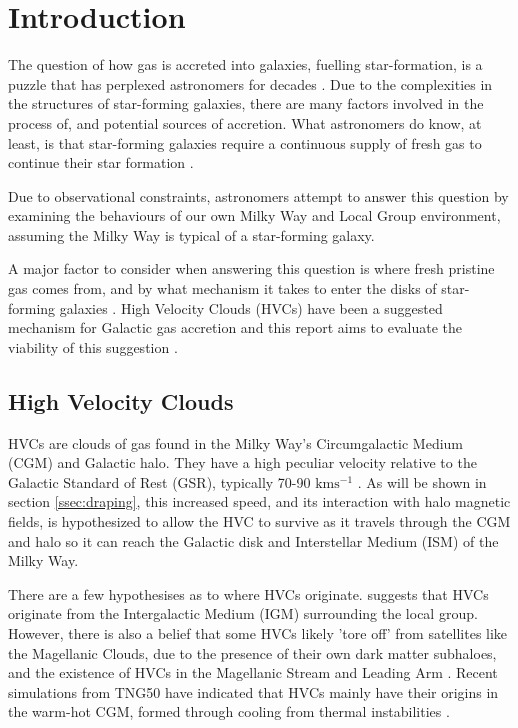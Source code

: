 \chapter{Introduction}
\label{cha:introduction}

The question of how gas is accreted into galaxies, fuelling star-formation, is a puzzle that has perplexed astronomers for decades \citep{ID28,ID23}. Due to the complexities in the structures of star-forming galaxies, there are many factors involved in the process of, and potential sources of accretion. What astronomers do know, at least, is that star-forming galaxies require a continuous supply of fresh gas to continue their star formation \citep{ID28,ID23, ID19}.


Due to observational constraints, astronomers attempt to answer this question by examining the behaviours of our own Milky Way and Local Group environment, assuming the Milky Way is typical of a star-forming galaxy.


A major factor to consider when answering this question is where fresh pristine gas comes from, and by what mechanism it takes to enter the disks of star-forming galaxies \citep{ID8, ID28, ID49}. High Velocity Clouds (HVCs) have been a suggested mechanism for Galactic gas accretion and this report aims to evaluate the viability of this suggestion \citep{ID3,ID19}. 


\section{High Velocity Clouds}
\label{sec:hvcs}

HVCs are clouds of gas found in the Milky Way's Circumgalactic Medium (CGM) and Galactic halo. They have a high peculiar velocity relative to the Galactic Standard of Rest (GSR), typically 70-90 $\mathrm{km s^{-1}}$ \citep{ID7, ID8}. As will be shown in section \ref{ssec:draping}, this increased speed, and its interaction with halo magnetic fields, is hypothesized to allow the HVC to survive as it travels through the CGM and halo so it can reach the Galactic disk and Interstellar Medium (ISM) of the Milky Way.


There are a few hypothesises as to where HVCs originate. \cite{ID19} suggests that HVCs originate from the Intergalactic Medium (IGM) surrounding the local group. However, there is also a belief that some HVCs likely 'tore off' from satellites like the Magellanic Clouds, due to the presence of their own dark matter subhaloes, and the existence of HVCs in the Magellanic Stream and Leading Arm \citep{ID27, ID2}. Recent simulations from TNG50 have indicated that HVCs mainly have their origins in the warm-hot CGM, formed through cooling from thermal instabilities \citep{ID74}.


